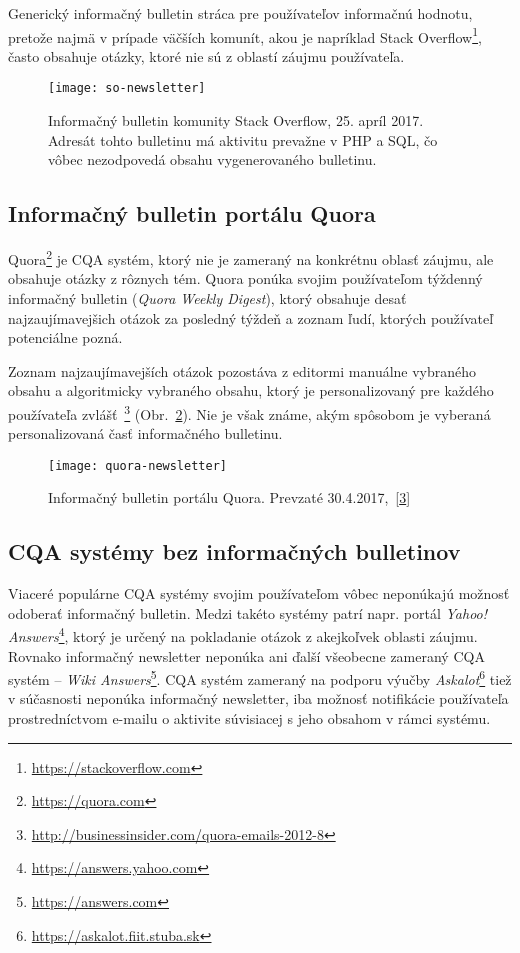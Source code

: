 Generický informačný bulletin stráca pre používateľov informačnú hodnotu, pretože
najmä v prípade väčších komunít, akou je napríklad Stack Overflow\footnote{\url{https://stackoverflow.com}}, často obsahuje
otázky, ktoré nie sú z oblastí záujmu používateľa.


\begin{figure}[H]\begin{center}
\texttt{[image: so-newsletter]}
\caption{Informačný bulletin komunity Stack Overflow, 25. apríl 2017. Adresát tohto bulletinu má aktivitu prevažne v
PHP a SQL, čo vôbec nezodpovedá obsahu vygenerovaného bulletinu. \label{fig:so-newsletter}}\end{center}
\end{figure}

\subsection{Informačný bulletin portálu Quora}

Quora\footnote{\url{https://quora.com}} je CQA systém, ktorý nie je zameraný na konkrétnu oblasť záujmu, ale obsahuje
otázky z rôznych tém. Quora ponúka svojim používateľom týždenný informačný bulletin (\emph{Quora Weekly Digest}),
ktorý obsahuje desať najzaujímavejšich otázok za posledný týždeň a zoznam ľudí, ktorých používateľ potenciálne pozná.

Zoznam najzaujímavejších otázok pozostáva z editormi manuálne vybraného obsahu a algoritmicky vybraného obsahu,
ktorý je personalizovaný pre každého používateľa zvlášť~\footnote{\url{http://businessinsider.com/quora-emails-2012-8}\label{fnote-bi}} (Obr.~\ref{fig:quora-newsletter}).
Nie je však známe, akým spôsobom je vyberaná personalizovaná časť informačného bulletinu.

\begin{figure}[H]\begin{center}
\texttt{[image: quora-newsletter]}
\caption{Informačný bulletin portálu Quora. Prevzaté 30.4.2017,~[\ref{fnote-bi}] \label{fig:quora-newsletter}}\end{center}
\end{figure}

\subsection{CQA systémy bez informačných bulletinov}

Viaceré populárne CQA systémy svojim používateľom vôbec neponúkajú možnosť odoberať informačný bulletin. Medzi takéto
systémy patrí napr. portál \emph{Yahoo! Answers}\footnote{\url{https://answers.yahoo.com}}, ktorý je určený na pokladanie
otázok z akejkoľvek oblasti záujmu. Rovnako informačný newsletter neponúka ani ďalší všeobecne zameraný CQA systém --
\emph{Wiki Answers}\footnote{\url{https://answers.com}}. CQA systém zameraný na podporu výučby
\emph{Askalot}\footnote{\url{https://askalot.fiit.stuba.sk}} tiež v súčasnosti neponúka informačný newsletter,
iba možnosť notifikácie používateľa prostredníctvom e-mailu o aktivite súvisiacej s jeho obsahom v rámci systému.


